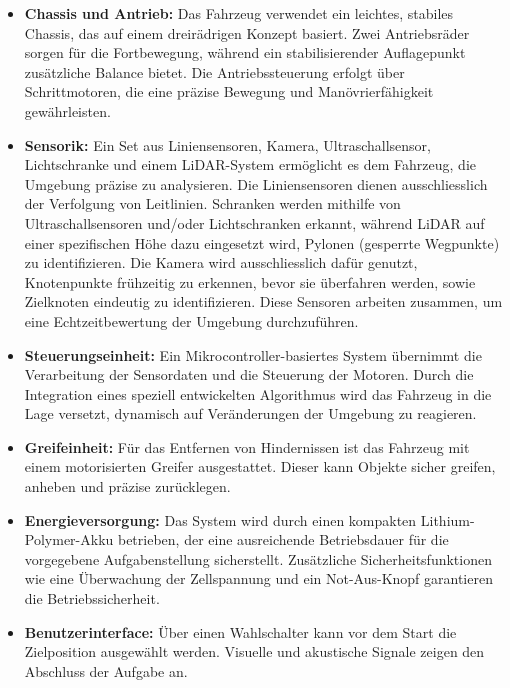 \documentclass[main.tex]{subfiles} %
\begin{document}
\begin{itemize}
    \item \textbf{Chassis und Antrieb:} Das Fahrzeug verwendet ein leichtes, stabiles Chassis, das auf einem dreirädrigen Konzept basiert. Zwei Antriebsräder sorgen für die Fortbewegung, während ein stabilisierender Auflagepunkt zusätzliche Balance bietet. Die Antriebssteuerung erfolgt über Schrittmotoren, die eine präzise Bewegung und Manövrierfähigkeit gewährleisten.

    \item \textbf{Sensorik:} Ein Set aus Liniensensoren, Kamera, Ultraschallsensor, Lichtschranke und einem LiDAR-System ermöglicht es dem Fahrzeug, die Umgebung präzise zu analysieren. Die Liniensensoren dienen ausschliesslich der Verfolgung von Leitlinien. Schranken werden mithilfe von Ultraschallsensoren und/oder Lichtschranken erkannt, während LiDAR auf einer spezifischen Höhe dazu eingesetzt wird, Pylonen (gesperrte Wegpunkte) zu identifizieren. Die Kamera wird ausschliesslich dafür genutzt, Knotenpunkte frühzeitig zu erkennen, bevor sie überfahren werden, sowie Zielknoten eindeutig zu identifizieren. Diese Sensoren arbeiten zusammen, um eine Echtzeitbewertung der Umgebung durchzuführen.

    \item \textbf{Steuerungseinheit:} Ein Mikrocontroller-basiertes System übernimmt die Verarbeitung der Sensordaten und die Steuerung der Motoren. Durch die Integration eines speziell entwickelten Algorithmus wird das Fahrzeug in die Lage versetzt, dynamisch auf Veränderungen der Umgebung zu reagieren.

    \item \textbf{Greifeinheit:} Für das Entfernen von Hindernissen ist das Fahrzeug mit einem motorisierten Greifer ausgestattet. Dieser kann Objekte sicher greifen, anheben und präzise zurücklegen.

    \item \textbf{Energieversorgung:} Das System wird durch einen kompakten Lithium-Polymer-Akku betrieben, der eine ausreichende Betriebsdauer für die vorgegebene Aufgabenstellung sicherstellt. Zusätzliche Sicherheitsfunktionen wie eine Überwachung der Zellspannung und ein Not-Aus-Knopf garantieren die Betriebssicherheit.

    \item \textbf{Benutzerinterface:} Über einen Wahlschalter kann vor dem Start die Zielposition ausgewählt werden. Visuelle und akustische Signale zeigen den Abschluss der Aufgabe an.


\end{itemize}
\end{document}
